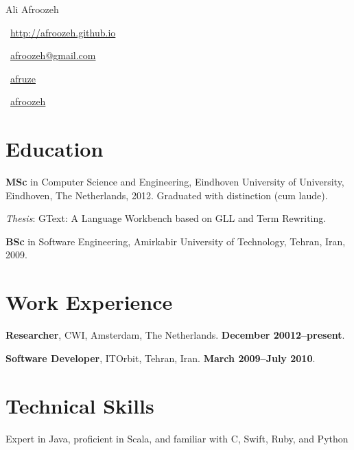 \documentclass[letterpaper,11pt]{article}
\def\name{Ali Afroozeh}
\renewenvironment{itemize}{
  \begin{list}{}{
    \setlength{\leftmargin}{1.5em}
  }
}{
  \end{list}
}
\begin{document}
{\huge \name}


\vspace{0.25in}

\faGlobe~\href{http://afroozeh.github.io/}{http://afroozeh.github.io}
\vspace{0.02in}

\faEnvelopeO~\href{mailto:afroozeh@gmail.com}{afroozeh@gmail.com}
\vspace{0.02in}

\faTwitter~\href{https://twitter.com/afruze}{afruze}
\vspace{0.02in}

\faGithub~\href{https://github.com/afroozeh}{afroozeh}

\section*{Education}

\begin{itemize}
  \item \textbf{MSc} in Computer Science and Engineering, Eindhoven University of University,
  Eindhoven, The Netherlands, 2012. Graduated with distinction (cum laude).

  \textit{Thesis}: GText: A Language Workbench based on GLL and Term Rewriting.

  \item \textbf{BSc} in Software Engineering, Amirkabir University of Technology, Tehran, Iran, 2009.
\end{itemize}


\section*{Work Experience}

\begin{itemize}
\item \textbf{Researcher}, CWI, Amsterdam, The Netherlands. \textbf{December 20012--present}.
\item \textbf{Software Developer}, ITOrbit, Tehran, Iran. \textbf{March 2009--July 2010}.
\end{itemize}

\section*{Technical Skills} 

\begin{itemize}
\item Expert in Java, proficient in Scala, and familiar with C, Swift, Ruby, and Python
\end{itemize}
\end{document}
